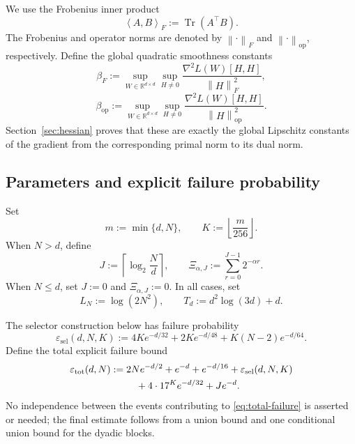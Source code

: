 \documentclass[11pt]{article}
\newcommand{\R}{\mathbb{R}}
\newcommand{\1}{\mathbf{1}}
\newcommand{\op}{\mathrm{op}}
\newcommand{\Tr}{\operatorname{Tr}}
\newcommand{\ip}[2]{\left\langle #1,#2\right\rangle_F}
\newcommand{\norm}[1]{\left\|#1\right\|}
\begin{document}
We use the Frobenius inner product
\[
 \ip{A}{B}:=\Tr(A^\top B).
\]
The Frobenius and operator norms are denoted by \(\norm{\cdot}_F\) and
\(\norm{\cdot}_{\op}\), respectively.  Define the global quadratic
smoothness constants
\[
 \beta_F
 :=
 \sup_{W\in\R^{d\times d}}
 \sup_{H\ne 0}
 \frac{\nabla^2L(W)[H,H]}{\norm{H}_F^2},
\]
\[
 \beta_{\op}
 :=
 \sup_{W\in\R^{d\times d}}
 \sup_{H\ne 0}
 \frac{\nabla^2L(W)[H,H]}{\norm{H}_{\op}^2}.
\]
Section~\ref{sec:hessian} proves that these are exactly the global Lipschitz
constants of the gradient from the corresponding primal norm to its dual norm.

\subsection{Parameters and explicit failure probability}

Set
\[
 m:=\min\{d,N\},
 \qquad
 K:=\left\lfloor\frac{m}{256}\right\rfloor.
\]
When \(N>d\), define
\[
 J:=\left\lceil\log_2\frac Nd\right\rceil,
 \qquad
 \Xi_{\alpha,J}:=\sum_{r=0}^{J-1}2^{-\alpha r}.
\]
When \(N\le d\), set \(J:=0\) and \(\Xi_{\alpha,J}:=0\).  In all cases, set
\[
 L_N:=\log(2N^2),
 \qquad
 T_d:=d^2\log(3d)+d.
\]

The selector construction below has failure probability
\[
 \varepsilon_{\mathrm{sel}}(d,N,K)
 :=
 4K e^{-d/32}
 +2K e^{-d/48}
 +K(N-2)e^{-d/64}.
\]
Define the total explicit failure bound
\begin{align}
 \varepsilon_{\mathrm{tot}}(d,N)
 :=\;&
 2N e^{-d/2}
 +e^{-d}
 +e^{-d/16}
 +\varepsilon_{\mathrm{sel}}(d,N,K)
 \notag\\
 &\quad
 +4\cdot 17^K e^{-d/32}
 +J e^{-d}.
 \label{eq:total-failure}
\end{align}
No independence between the events contributing to
\eqref{eq:total-failure} is asserted or needed; the final estimate follows from
a union bound and one conditional union bound for the dyadic blocks.
\end{document}
